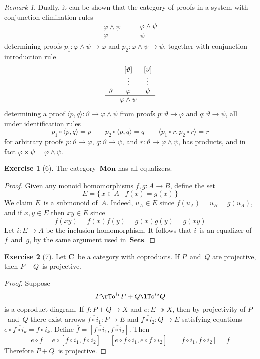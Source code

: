 \documentclass[letterpaper,12pt]{article}
\newcommand{\epi}{\twoheadrightarrow}
\newcommand{\after}{\circ}
\newcommand{\pair}[2]{\langle{#1},{#2}\rangle}
\newcommand{\copair}[2]{[{#1},{#2}]}
\newcommand{\cat}[1]{\mathbf{#1}}
\newcommand{\2}{\cat{2}}
\newcommand{\C}{\cat{C}}
\newcommand{\Sets}{\cat{Sets}}
\newcommand{\Mon}{\cat{Mon}}
\theoremstyle{definition}
\newtheorem*{exer}{Exercise}
\theoremstyle{remark}
\newtheorem*{rmk}{Remark}
\theoremstyle{direction}
\begin{document}
\begin{rmk}
Dually, it can be shown that the category of proofs in a system with conjunction elimination rules
\[\begin{array}{c}
\varphi\land\psi\\
\hline
\varphi
\end{array}
\qquad
\begin{array}{c}
\varphi\land\psi\\
\hline
\psi
\end{array}\]
determining proofs \(p_1:\varphi\land\psi\to\varphi\) and \(p_2:\varphi\land\psi\to\psi\), together with conjunction introduction rule
\[\begin{array}{ccc}
&[\vartheta]&[\vartheta]\\
&\vdots&\vdots\\
\vartheta&\varphi&\psi\\
\hline
&\varphi\land\psi&
\end{array}\]
determining a proof \(\pair{p}{q}:\vartheta\to\varphi\land\psi\) from proofs \(p:\vartheta\to\varphi\) and \(q:\vartheta\to\psi\), all under identification rules
\[p_1\after\pair{p}{q}=p\qquad p_2\after\pair{p}{q}=q\qquad\pair{p_1\after r}{p_2\after r}=r\]
for arbitrary proofs \(p:\vartheta\to\varphi\), \(q:\vartheta\to\psi\), and \(r:\vartheta\to\varphi\land\psi\), has products, and in fact \(\varphi\times\psi=\varphi\land\psi\).
\end{rmk}

\begin{exer}[6]
The category~\(\Mon\) has all equalizers.
\end{exer}
\begin{proof}
Given any monoid homomorphisms \(f,g:A\to B\), define the set
\[E=\{\,x\in A\mid f(x)=g(x)\,\}\]
We claim \(E\)~is a submonoid of~\(A\). Indeed, \(u_A\in E\) since \(f(u_A)=u_B=g(u_A)\), and if \(x,y\in E\) then \(xy\in E\) since
\[f(xy)=f(x)f(y)=g(x)g(y)=g(xy)\]
Let \(i:E\to A\) be the inclusion homomorphism. It follows that \(i\)~is an equalizer of \(f\)~and~\(g\), by the same argument used in~\(\Sets\).
\end{proof}

\begin{exer}[7]
Let \(\C\)~be a category with coproducts. If \(P\)~and~\(Q\) are projective, then \(P+Q\)~is projective.
\end{exer}
\begin{proof}
Suppose
\[P\rTo^{i_1}P+Q\lTo^{i_2}Q\]
is a coproduct diagram. If \(f:P+Q\to X\) and \(e:E\epi X\), then by projectivity of \(P\)~and~\(Q\) there exist arrows \(\overline{f\after i_1}:P\to E\) and \(\overline{f\after i_2}:Q\to E\) satisfying equations \(e\after\overline{f\after i_k}=f\after i_k\). Define \(\overline{f}=\copair{\overline{f\after i_1}}{\overline{f\after i_2}}\). Then
\[e\after\overline{f}
=e\after\copair{\overline{f\after i_1}}{\overline{f\after i_2}}
=\copair{e\after\overline{f\after i_1}}{e\after\overline{f\after i_2}}
=\copair{f\after i_1}{f\after i_2}
=f\]
Therefore \(P+Q\)~is projective.
\end{proof}
\end{document}
